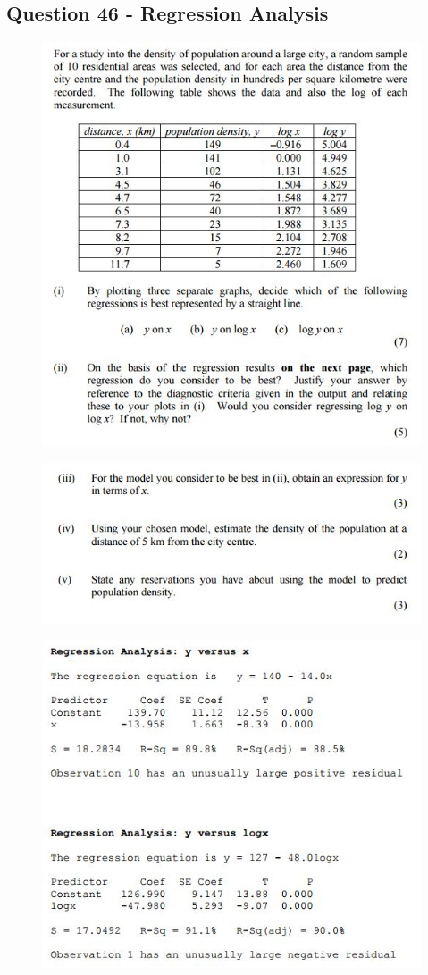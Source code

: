 \documentclass[a4paper,12pt]{article}
\begin{document}
\subsection*{Question 46 - Regression Analysis}
\begin{figure}[h!]
	\centering
	\includegraphics[width=0.8\linewidth]{images/ReviewQ18-a}
\end{figure}
\begin{figure}[h!]
	\centering
	\includegraphics[width=0.8\linewidth]{images/ReviewQ18-b}
\end{figure}
\newpage
\begin{figure}[h!]
	\centering
	\includegraphics[width=0.8\linewidth]{images/ReviewQ18-c}
\end{figure}
\end{document}
